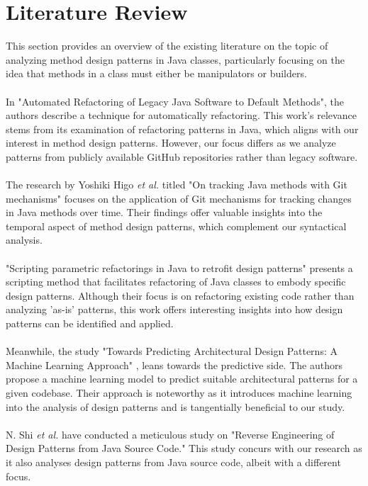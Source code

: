 \documentclass[draft]{article}
\begin{document}
\section{Literature Review}
This section provides an overview of the existing literature on the topic of analyzing method design patterns in Java classes, particularly focusing on the idea that methods in a class must either be manipulators or builders.\\
~\\
In "{}Automated Refactoring of Legacy Java Software to Default Methods"{}, the authors describe a technique for automatically refactoring\cite{ref1}. This work's relevance stems from its examination of refactoring patterns in Java, which aligns with our interest in method design patterns. However, our focus differs as we analyze patterns from publicly available GitHub repositories rather than legacy software.\\
~\\
The research by Yoshiki Higo \textit{et al.}\cite{ref2} titled "{}On tracking Java methods with Git mechanisms"{} focuses on the application of Git mechanisms for tracking changes in Java methods over time. Their findings offer valuable insights into the temporal aspect of method design patterns, which complement our syntactical analysis.\\
~\\
"{}Scripting parametric refactorings in Java to retrofit design patterns"{} \cite{ref3} presents a scripting method that facilitates refactoring of Java classes to embody specific design patterns. Although their focus is on refactoring existing code rather than analyzing 'as-is' patterns, this work offers interesting insights into how design patterns can be identified and applied.\\
~\\
Meanwhile, the study "{}Towards Predicting Architectural Design Patterns: A Machine Learning Approach"{} \cite{ref4}, leans towards the predictive side. The authors propose a machine learning model to predict suitable architectural patterns for a given codebase. Their approach is noteworthy as it introduces machine learning into the analysis of design patterns and is tangentially beneficial to our study.\\
~\\
N. Shi \textit{et al.} \cite{ref5} have conducted a meticulous study on "{}Reverse Engineering of Design Patterns from Java Source Code."{} This study concurs with our research as it also analyses design patterns from Java source code, albeit with a different focus.\\
\end{document}
